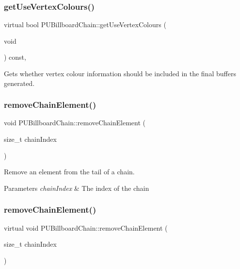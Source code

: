 \subsubsection{\texorpdfstring{get\+Use\+Vertex\+Colours()}{getUseVertexColours()}\hspace{0.1cm}{\footnotesize\ttfamily [2/2]}}
{\footnotesize\ttfamily virtual bool P\+U\+Billboard\+Chain\+::get\+Use\+Vertex\+Colours (\begin{DoxyParamCaption}\item[{void}]{ }\end{DoxyParamCaption}) const\hspace{0.3cm}{\ttfamily [inline]}, {\ttfamily [virtual]}}

Gets whether vertex colour information should be included in the final buffers generated. \mbox{\label{classPUBillboardChain_aa24788b7382cb562efa7504a6c1f5615}} 
\subsubsection{\texorpdfstring{remove\+Chain\+Element()}{removeChainElement()}\hspace{0.1cm}{\footnotesize\ttfamily [1/2]}}
{\footnotesize\ttfamily void P\+U\+Billboard\+Chain\+::remove\+Chain\+Element (\begin{DoxyParamCaption}\item[{size\+\_\+t}]{chain\+Index }\end{DoxyParamCaption})\hspace{0.3cm}{\ttfamily [virtual]}}

Remove an element from the \textquotesingle{}tail\textquotesingle{} of a chain. 
\begin{DoxyParams}{Parameters}
{\em chain\+Index} & The index of the chain \\
\hline
\end{DoxyParams}
\mbox{\label{classPUBillboardChain_a3cf3a2e985beb74ddc5474f2f80846f6}} 
\subsubsection{\texorpdfstring{remove\+Chain\+Element()}{removeChainElement()}\hspace{0.1cm}{\footnotesize\ttfamily [2/2]}}
{\footnotesize\ttfamily virtual void P\+U\+Billboard\+Chain\+::remove\+Chain\+Element (\begin{DoxyParamCaption}\item[{size\+\_\+t}]{chain\+Index }\end{DoxyParamCaption})\hspace{0.3cm}{\ttfamily [virtual]}}

